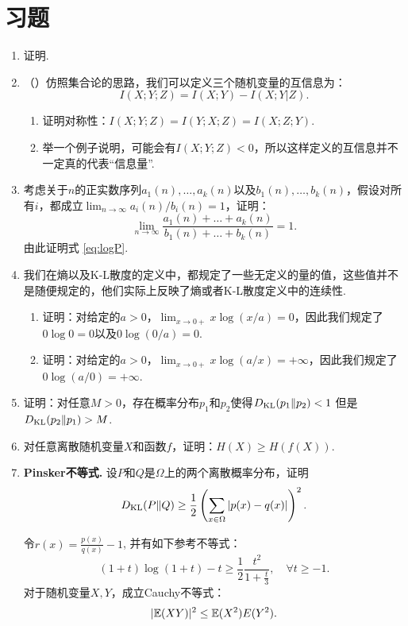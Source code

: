 \section{习题}
\begin{enumerate}[wide, labelindent=0pt]
    \item \label{exercise:conditional-mutual-information} 证明. 
    
    \item （\cite{tingAmountInformation1962}）仿照集合论的思路，我们可以定义三个随机变量的互信息为：
    \[I(X;Y;Z)=I(X;Y)-I(X;Y|Z).\]
    \begin{enumerate}
        \item 证明对称性：$I(X;Y;Z)=I(Y;X;Z) = I(X;Z;Y)$.
        \item 举一个例子说明，可能会有$I(X;Y;Z)<0$，所以这样定义的互信息并不一定真的代表“信息量”.
    \end{enumerate}

    \item 考虑关于$n$的正实数序列$a_1(n),\dots,a_k(n)$以及$b_1(n),\dots,b_k(n)$，假设对所有$i$，都成立$\lim_{n\to\infty} a_i(n)/b_i(n)=1$，证明：
    \[\lim_{n\to\infty}\frac{a_1(n)+\dots+a_k(n)}{b_1(n)+\dots+b_k(n)}=1.\]
    由此证明式 \eqref{eq:logP}.

    \item 我们在熵以及K-L散度的定义中，都规定了一些无定义的量的值，这些值并不是随便规定的，他们实际上反映了熵或者K-L散度定义中的连续性.
    \begin{enumerate}
        \item 证明：对给定的$a>0$，$\lim_{x\to 0+}x\log (x/a)=0$，因此我们规定了$0\log 0=0$以及$0\log(0/a)=0$.
        \item 证明：对给定的$a>0$，$\lim_{x\to 0+}x\log (a/x)=+\infty$，因此我们规定了$0\log(a/0)=+\infty$.
    \end{enumerate}
    
    
    \item \label{exercise:kl-divergence-asymmetry} 证明：对任意$M>0$，存在概率分布$p_1$和$p_2$使得$D_{\mathrm{KL}}(p_{1}\Vert p_{2})<1$ 但是 $D_{\mathrm{KL}}(p_{2}\Vert p_{1})>M$.
    
    \item 对任意离散随机变量$X$和函数$f$，证明：$H(X)\geq H(f(X))$.
    
    \item \textbf{Pinsker不等式. }设$P$和$Q$是$\Omega$上的两个离散概率分布，证明
    \[
        D_{\mathrm{KL}}(P\Vert Q) \geq \frac{1}{2} \left(\sum_{x\in \Omega} |p(x) - q(x)|\right)^2.
    \]
    \begin{hint}
        令$r(x) = \frac{p(x)}{q(x)} - 1$, 并有如下参考不等式：
        \[
            (1+t) \log (1+t) - t \geqslant \frac{1}{2} \frac{t^2}{1+\frac{t}{3}}, \quad \forall t \geqslant -1.
        \]
        对于随机变量$X,Y$，成立Cauchy不等式：
        \[
            |\mathbb{E}(XY)|^2 \leq \mathbb{E}(X^2)E(Y^2).
        \]
    \end{hint}


\end{enumerate}
